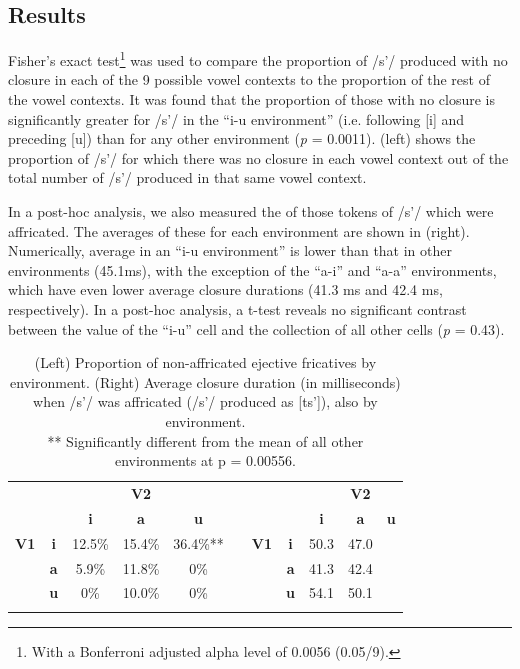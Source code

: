 \documentclass[output=paper,newtxmath,modfonts,nonflat,final]{langsci/langscibook}
\begin{document}
\subsection{Results}\label{sec:moeng:5.3}

Fisher’s exact test\footnote{With a Bonferroni adjusted alpha level of 0.0056 (0.05/9).} was used to compare the proportion of /s’/ produced with no closure in each of the 9 possible vowel contexts to the proportion of the rest of the vowel contexts. It was found that the proportion of those with no closure is significantly greater for /s’/ in the “i-u environment” (i.e. following [i] and preceding [u]) than for any other environment (\textit{p} = 0.0011).  (left) shows the proportion of /s’/ for which there was no closure in each vowel context out of the total number of /s’/ produced in that same vowel context. 

In a post-hoc analysis, we also measured the  of those tokens of /s’/ which were affricated. The averages of these for each environment are shown in  (right). Numerically, average  in an “i-u environment” is lower than that in other environments (45.1ms), with the exception of the “a-i” and “a-a” environments, which have even lower average closure durations (41.3 ms and 42.4 ms, respectively). In a post-hoc analysis, a t-test reveals no significant contrast between the value of the “i-u” cell and the collection of all other cells (\textit{p} = 0.43).

\begin{table}
\begin{tabular}{ccccccccccc}
\lsptoprule
&  & & { \bfseries V2} & &  &  &  & & { \bfseries V2} &\\
 &  & \bfseries i & \bfseries a & \bfseries u &  &  &  & \bfseries i & \bfseries a & \bfseries u\\
\midrule
\bfseries V1 & \bfseries i & 12.5\% & 15.4\% & 36.4\%** &  & \bfseries V1 & \bfseries i & 50.3 & 47.0 & \\
& \bfseries a & 5.9\% & 11.8\% & 0\% &  &  & \bfseries a & 41.3 & 42.4 & \\
& \bfseries u & 0\% & 10.0\% & 0\% &  &  & \bfseries u & 54.1 & 50.1 & \\
\lspbottomrule
\end{tabular}
\caption{(Left) Proportion of non-affricated ejective fricatives by environment. (Right) Average closure duration (in milliseconds) when /s’/ was affricated (/s’/ produced as [ts’]), also by environment.\\
** Significantly different from the mean of all other environments at p = 0.00556.
}
\label{tab:moeng:2}
\end{table}
\end{document}
